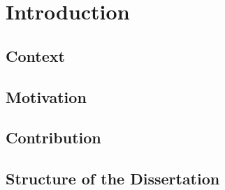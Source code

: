 \chapter{Introduction}

\section{Context}

\section{Motivation}

\section{Contribution}

\section{Structure of the Dissertation}
